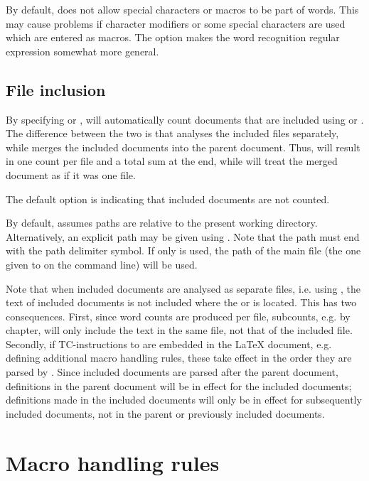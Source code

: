 \documentclass{article}
\begin{document}
By default, \TeXcount{} does not allow special characters or macros to be part of words. This may cause problems if character modifiers or some special characters are used which are entered as macros. The  option makes the word recognition regular expression somewhat more general.

\subsection{File inclusion}

By specifying  or , \TeXcount{} will automatically count documents that are included using  or . The difference between the two is that  analyses the included files separately, while  merges the included documents into the parent document. Thus,  will result in one count per file and a total sum at the end, while  will treat the merged document as if it was one file.

The default option is  indicating that included documents are not counted.

By default, \TeXcount{} assumes paths are relative to the present working directory. Alternatively, an explicit path may be given using . Note that the path must end with the path delimiter symbol. If only  is used, the path of the main file (the one given to \TeXcount{} on the command line) will be used.

Note that when included documents are analysed as separate files, i.e. using , the text of included documents is not included where the  or  is located. This has two consequences. First, since word counts are produced per file, subcounts, e.g. by chapter, will only include the text in the same file, not that of the included file. Secondly, if TC-instructions to \TeXcount{} are embedded in the \LaTeX{} document, e.g. defining additional macro handling rules, these take effect in the order they are parsed by \TeXcount{}. Since included documents are parsed after the parent document, definitions in the parent document will be in effect for the included documents; definitions made in the included documents will only be in effect for subsequently included documents, not in the parent or previously included documents.


\section{Macro handling rules}
\end{document}

